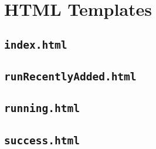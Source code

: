 %

\chapter{HTML Templates}\label{appa:htmlcode}


\section{\texttt{index.html}}


\pagebreak

\section{\texttt{runRecentlyAdded.html}}



\pagebreak

\section{\texttt{running.html}}



\section{\texttt{success.html}}


